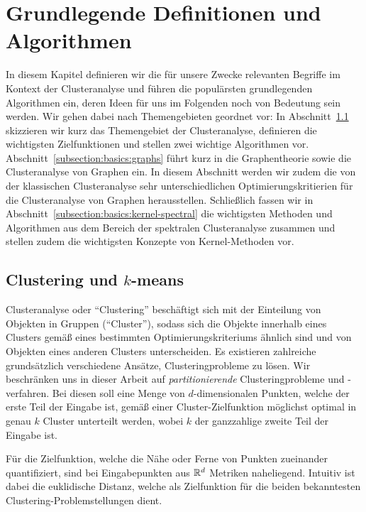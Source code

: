 \section{Grundlegende Definitionen und Algorithmen}
\label{section:basics}

In diesem Kapitel definieren wir die für unsere Zwecke relevanten Begriffe im Kontext der Clusteranalyse und führen die
populärsten grundlegenden Algorithmen ein, deren Ideen für uns im Folgenden noch von Bedeutung sein werden. Wir gehen dabei
nach Themengebieten geordnet vor: In Abschnitt~\ref{subsection:basics:clustering} skizzieren wir kurz das
Themengebiet der Clusteranalyse, definieren die wichtigsten Zielfunktionen und stellen zwei wichtige Algorithmen vor.
Abschnitt~\ref{subsection:basics:graphs} führt kurz in die Graphentheorie sowie die Clusteranalyse von Graphen ein. In diesem
Abschnitt werden wir zudem die von der klassischen Clusteranalyse sehr unterschiedlichen Optimierungskritierien für die
Clusteranalyse von Graphen herausstellen. Schließlich fassen wir in Abschnitt~\ref{subsection:basics:kernel-spectral} die
wichtigsten Methoden und Algorithmen aus dem Bereich der spektralen Clusteranalyse zusammen und stellen zudem die wichtigsten
Konzepte von Kernel-Methoden vor.

\subsection{Clustering und \texorpdfstring{$k$}{k}-means}
\label{subsection:basics:clustering}

Clusteranalyse oder "`Clustering"' beschäftigt sich mit der Einteilung von Objekten in Gruppen ("`Cluster"'), sodass
sich die Objekte innerhalb eines Clusters gemäß eines bestimmten Optimierungskriteriums ähnlich sind und von Objekten eines
anderen Clusters unterscheiden. Es existieren zahlreiche grundsätzlich verschiedene Ansätze, Clusteringprobleme zu lösen.
Wir beschränken uns in dieser Arbeit auf \emph{partitionierende} Clusteringprobleme und -verfahren. Bei diesen
soll eine Menge von $d$-dimensionalen Punkten, welche der erste Teil der Eingabe ist, gemäß einer Cluster-Zielfunktion möglichst
optimal in genau $k$ Cluster unterteilt werden, wobei $k$ der ganzzahlige zweite Teil der Eingabe ist.

Für die Zielfunktion, welche die Nähe oder Ferne von Punkten zueinander quantifiziert, sind bei Eingabepunkten aus
$\mathbb{R}^{d}$ Metriken naheliegend. Intuitiv ist dabei die euklidische Distanz, welche als Zielfunktion für die beiden bekanntesten
Clustering-Problemstellungen dient.

